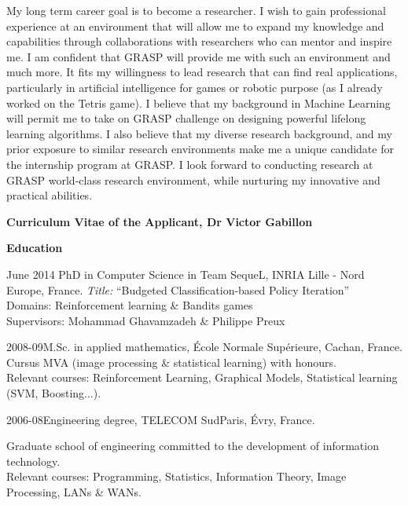 My long term career goal is to become a  researcher.  I wish to gain professional experience at an environment that will allow me to expand my knowledge and capabilities through collaborations with researchers who can mentor and inspire me. I am confident that GRASP will provide me with such an environment and much more. It fits my willingness to  lead research that can find real applications, particularly in artificial intelligence for games or robotic purpose (as I already worked on the Tetris game). I believe that my background in Machine Learning will permit me to take on GRASP challenge on designing powerful lifelong learning algorithms. I also believe that my diverse research background, and my prior exposure to similar research environments make me a unique candidate for the internship program at GRASP. I look forward to conducting research at GRASP  world-class research environment, while nurturing my innovative and practical abilities.
 \begin{center} \textbf{Curriculum Vitae of the Applicant, Dr Victor Gabillon}  \end{center}
 
\noindent\textbf{Education}\\[-.4cm]\noindent\makebox[\linewidth]{\rule{\columnwidth}{0.4pt}}
\begin{vitem}{June 2014 }{PhD in Computer Science}
 in Team SequeL, INRIA Lille - Nord Europe, France.
\textit{Title:} ``Budgeted Classification-based Policy Iteration''\\
Domains: Reinforcement learning \& Bandits games\\
Supervisors: Mohammad Ghavamzadeh \& Philippe Preux

 \end{vitem}


 \begin{vitem}{2008-09}{M.Sc. in applied mathematics, École Normale Supérieure, Cachan, France.}
Cursus MVA (image processing \& statistical learning) with honours.\\
Relevant courses: Reinforcement Learning, Graphical Models, Statistical learning (SVM, Boosting...).
 \end{vitem}

 \begin{vitem}{2006-08}{Engineering degree, TELECOM SudParis, Évry, France.}

Graduate school of engineering committed to the development of information technology. \\
Relevant courses: Programming, Statistics, Information Theory, Image Processing, LANs \& WANs.
 \end{vitem}
 
